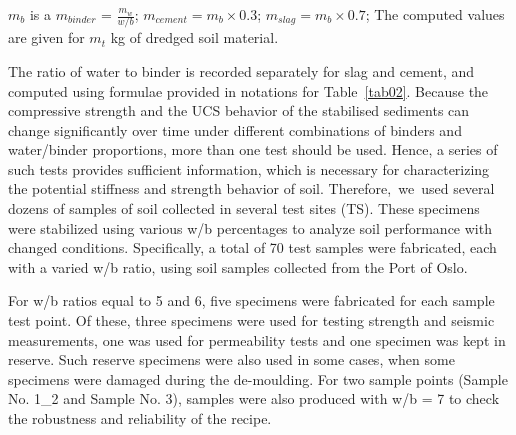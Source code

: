 \documentclass[sustainability,article,accept,pdftex,moreauthors]{Definitions/mdpi}
\begin{document}
{\begin{table}[H]
{	 $m_b$ is a $m_{binder}$ = $\frac{m_w}{w/b}$;
	 $m_{cement} = {m_b}\times 0.3$;
	 $m_{slag} = {m_b}\times 0.7$;
	 The computed values are given for $m_t$ kg of dredged soil material.}
\end{table}

The ratio of water to binder is recorded separately for slag {and} cement{, }and computed using formulae provided in notations for Table~\ref{tab02}. Because the compressive strength and {the }UCS behavior of {the }stabilised sediments can change {significantly} over time{ }under different combinations of binders{ }and water/binder proportions, more than one test should be used{. Hence, a series of such tests provides} sufficient information, {which is} necessary for characterizing the potential stiffness and strength behavior of soil. Therefore,~we~used {several dozens of }samples of soil collected in several test {sites} (TS){. These }specimens {were }stabilized using various w/b percentages to {analyze} soil performance with changed conditions. {Specifically, }a total of 70 test samples were fabricated, each with a varied w/b ratio, using soil samples collected from the Port of Oslo. 

For w/b ratios equal to 5 and 6, five specimens were fabricated for each sample test point. {Of these, }three specimens were used for testing strength and seismic measurements, one {was used }for permeability tests and one specimen was kept in reserve. Such reserve specimens were also used in some cases, when some specimens were damaged during {the }de-moulding. For two sample points (Sample No. 1\_2 and Sample No. 3), samples were also produced with w/b = 7 to check the robustness and reliability of the recipe. 

}
\end{document}
